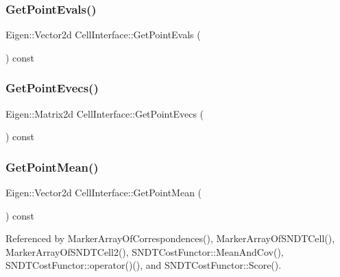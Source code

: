 \subsubsection{\texorpdfstring{Get\+Point\+Evals()}{GetPointEvals()}}
{\footnotesize\ttfamily Eigen\+::\+Vector2d Cell\+Interface\+::\+Get\+Point\+Evals (\begin{DoxyParamCaption}{ }\end{DoxyParamCaption}) const\hspace{0.3cm}{\ttfamily [inline]}}

\mbox{\label{classCellInterface_a727b6d5c67e6628db2edbe00df6d2b05}} 
\subsubsection{\texorpdfstring{Get\+Point\+Evecs()}{GetPointEvecs()}}
{\footnotesize\ttfamily Eigen\+::\+Matrix2d Cell\+Interface\+::\+Get\+Point\+Evecs (\begin{DoxyParamCaption}{ }\end{DoxyParamCaption}) const\hspace{0.3cm}{\ttfamily [inline]}}

\mbox{\label{classCellInterface_a8eecc9d9e5e3d6c327c830f15d0e4bed}} 
\subsubsection{\texorpdfstring{Get\+Point\+Mean()}{GetPointMean()}}
{\footnotesize\ttfamily Eigen\+::\+Vector2d Cell\+Interface\+::\+Get\+Point\+Mean (\begin{DoxyParamCaption}{ }\end{DoxyParamCaption}) const\hspace{0.3cm}{\ttfamily [inline]}}



Referenced by Marker\+Array\+Of\+Correspondences(), Marker\+Array\+Of\+S\+N\+D\+T\+Cell(), Marker\+Array\+Of\+S\+N\+D\+T\+Cell2(), S\+N\+D\+T\+Cost\+Functor\+::\+Mean\+And\+Cov(), S\+N\+D\+T\+Cost\+Functor\+::operator()(), and S\+N\+D\+T\+Cost\+Functor\+::\+Score().

